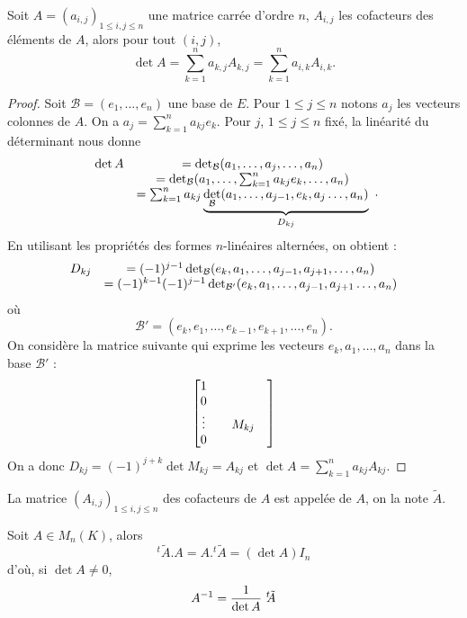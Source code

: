 \documentclass[class=report,crop=false]{standalone}
\begin{document}
\begin{theoreme}
Soit 
$A=(a_{i,j})_{1\leq i,j\leq n}$ une matrice carrée d'ordre $n$, $A_{i,j}$ les cofacteurs des éléments de $A$, 
alors pour tout $(i,j)$,
$$\det A= \sum_{k=1}^{n}a_{k,j}A_{k,j}=\sum_{k=1}^{n}a_{i,k}A_{i,k}.$$
\end{theoreme}    

\begin{proof}
Soit $\mathcal{B}=(e_1,\dots,e_n)$ une base de $E$. Pour $1\leq j\leq n$ notons $a_j$ les vecteurs colonnes de $A$. On a $a_j=\sum_{k=1}^n a_{kj}e_k$.
Pour $j$, $1\leq j\leq n$ fixé, la linéarité du déterminant nous donne
$$\begin{array}{cc}\det A &=\det_\mathcal{B}(a_1,\dots,a_j,\dots,a_n)\cr
&=\det_\mathcal{B}(a_1,\dots,\sum_{k=1}^n a_{kj}e_k,\dots,a_n)\cr
&=\sum_{k=1}^n a_{kj}\underbrace{\det_\mathcal{B}(a_1,\dots,a_{j-1},e_k,a_j\dots,a_n)}_{D_{kj}}\end{array}.$$
En utilisant les propriétés des formes $n$-linéaires alternées, on obtient :
$$\begin{array}{cc}D_{kj}&=(-1)^{j-1}\det_\mathcal{B}(e_k,a_1,\dots,a_{j-1},a_{j+1},\dots,a_n)\cr
&=(-1)^{k-1}(-1)^{j-1}\det_{\mathcal{B}'}(e_k,a_1,\dots,a_{j-1},a_{j+1}\dots,a_n)\end{array}$$
où
$${\mathcal{B}'}=(e_k,e_1,\dots,e_{k-1},e_{k+1},\dots,e_n).$$
On considère la matrice suivante qui exprime les vecteurs $e_k,a_1,\dots,a_n$ dans la base $\mathcal{B}'$ :
$$\left[\begin{matrix}1 & & & \cr 0& & & \cr \vdots&  &M_{kj}& \cr 0& & & \cr\end{matrix}\right]$$
On a donc $D_{kj}=(-1)^{j+k}\det M_{kj}=A_{kj}$ et $\det A=\sum_{k=1}^n a_{kj}A_{kj}$.
\end{proof}




\begin{definition}
La matrice $(A_{i,j})_{1\leq i,j\leq n}$ des cofacteurs de $A$ est appelée 
 de $A$, on la note $\tilde A$.
\end{definition} 

\begin{proposition}
Soit $A\in M_n(K)$, alors
$$^t\!\!\tilde A.A=A.^t\!\!\tilde A=(\det A)I_n$$
d'où, si $\det A\neq 0$,
$$A^{-1}={{1}\over{\det A}}\  ^t\!\!\tilde A$$
\end{proposition} 
\end{document}
